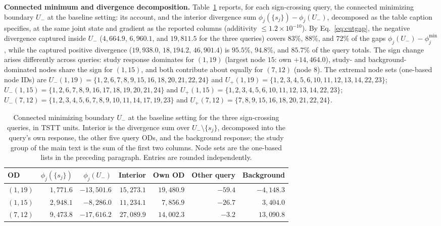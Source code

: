 \textbf{Connected minimum and divergence decomposition.}
Table~\ref{tab:negmech} reports, for each sign-crossing query, the
connected minimizing boundary $U_-$ at the baseline setting: its
account, and the interior divergence sum
$\phi_j(\{s_j\})-\phi_j(U_-)$, decomposed as the table caption
specifies, at the same joint state and gradient as the reported
columns (additivity $\le1.2\times10^{-10}$).
By Eq.~\eqref{eq:cutgap}, the negative divergence captured inside
$U_-$ ($4{,}664.9$, $6{,}960.1$, and $19{,}811.5$ for the three
queries) covers $83\%$, $88\%$, and $72\%$ of the gaps
$\phi_j(U_-)-\phi_j^{\min}$, while the captured positive divergence
($19{,}938.0$, $18{,}194.2$, $46{,}901.4$) is $95.5\%$, $94.8\%$,
and $85.7\%$ of the query totals. The sign change arises
differently across queries: study response
dominates for $(1,19)$ (largest node $15$: own $+14{,}464.0$),
study- and background-dominated nodes share the sign for $(1,15)$,
and both contribute about equally for $(7,12)$ (node $8$).
The extremal node sets (one-based node IDs) are
$U_-(1,19)=\{1,2,6,7,8,9,15,16,18,20,21,22,24\}$ and
$U_+(1,19)=\{1,2,3,4,5,6,10,11,12,13,14,22,23\}$;
$U_-(1,15)=\{1,2,6,7,8,9,16,17,18,19,20,21,24\}$ and
$U_+(1,15)=\{1,2,3,4,5,6,10,11,12,13,14,22,23\}$;
$U_-(7,12)=\{1,2,3,4,5,6,7,8,9,10,11,14,17,19,23\}$ and
$U_+(7,12)=\{7,8,9,15,16,18,20,21,22,24\}$.

\begin{table}[pos=tbh]
\footnotesize
\caption{Connected minimizing boundary $U_-$ at the baseline setting
for the three sign-crossing queries, in TSTT units. Interior is the
divergence sum over $U_-\setminus\{s_j\}$, decomposed into the query's
own response, the other five query ODs, and the background response;
the study group of the main text is the sum of the first two columns.
Node sets are the one-based lists in the preceding paragraph. Entries
are rounded independently.}
\label{tab:negmech}
\small
\begin{tabular*}{\tblwidth}{@{\extracolsep{\fill}}lrrrrrr}
\toprule
OD & $\phi_j(\{s_j\})$ & $\phi_j(U_-)$ & Interior & Own OD & Other query & Background\\
\midrule
$(1,19)$ & $1{,}771.6$ & $-13{,}501.6$ & $15{,}273.1$ & $19{,}480.9$ & $-59.4$ & $-4{,}148.3$ \\
$(1,15)$ & $2{,}948.1$ & $-8{,}286.0$ & $11{,}234.1$ & $7{,}856.9$ & $-26.7$ & $3{,}404.0$ \\
$(7,12)$ & $9{,}473.8$ & $-17{,}616.2$ & $27{,}089.9$ & $14{,}002.3$ & $-3.2$ & $13{,}090.8$ \\
\bottomrule
\end{tabular*}
\end{table}


